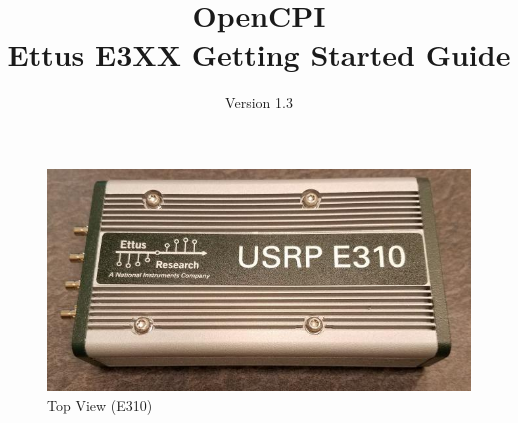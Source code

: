 \def\docTitle{OpenCPI\\Ettus E3XX Getting Started Guide}
\def\docVersion{1.3}

\date{Version \docVersion} %
\title{\docTitle}
\usepackage[T1]{fontenc} %
\usepackage{graphicx}
\graphicspath{ {figures/} }

\maketitle
\begin{figure}[H]
 \centering
 \includegraphics[scale=0.9]{img/top.jpg}
 \caption{Top View (E310)}
 \label{fig:top}
\end{figure}
\newpage

